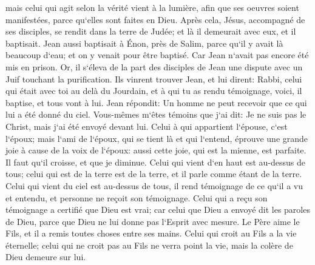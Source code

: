 \verse mais celui qui agit selon la vérité vient à la lumière, afin que ses oeuvres soient manifestées, parce qu`elles sont faites en Dieu. 
\verse Après cela, Jésus, accompagné de ses disciples, se rendit dans la terre de Judée; et là il demeurait avec eux, et il baptisait. 
\verse Jean aussi baptisait à Énon, près de Salim, parce qu`il y avait là beaucoup d`eau; et on y venait pour être baptisé. 
\verse Car Jean n`avait pas encore été mis en prison. 
\verse Or, il s`éleva de la part des disciples de Jean une dispute avec un Juif touchant la purification. 
\verse Ils vinrent trouver Jean, et lui dirent: Rabbi, celui qui était avec toi au delà du Jourdain, et à qui tu as rendu témoignage, voici, il baptise, et tous vont à lui. 
\verse Jean répondit: Un homme ne peut recevoir que ce qui lui a été donné du ciel. 
\verse Vous-mêmes m`êtes témoins que j`ai dit: Je ne suis pas le Christ, mais j`ai été envoyé devant lui. 
\verse Celui à qui appartient l`épouse, c`est l`époux; mais l`ami de l`époux, qui se tient là et qui l`entend, éprouve une grande joie à cause de la voix de l`époux: aussi cette joie, qui est la mienne, est parfaite. 
\verse Il faut qu`il croisse, et que je diminue. 
\verse Celui qui vient d`en haut est au-dessus de tous; celui qui est de la terre est de la terre, et il parle comme étant de la terre. Celui qui vient du ciel est au-dessus de tous, 
\verse il rend témoignage de ce qu`il a vu et entendu, et personne ne reçoit son témoignage. 
\verse Celui qui a reçu son témoignage a certifié que Dieu est vrai; 
\verse car celui que Dieu a envoyé dit les paroles de Dieu, parce que Dieu ne lui donne pas l`Esprit avec mesure. 
\verse Le Père aime le Fils, et il a remis toutes choses entre ses mains. 
\verse Celui qui croit au Fils a la vie éternelle; celui qui ne croit pas au Fils ne verra point la vie, mais la colère de Dieu demeure sur lui. 

\chapter{}

